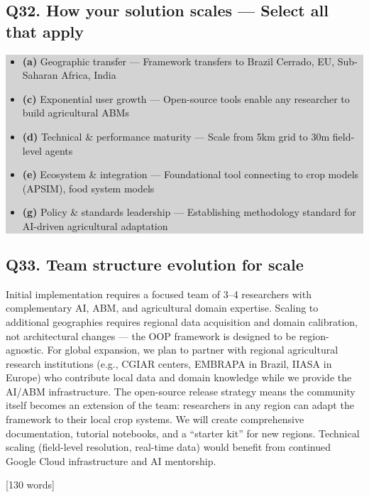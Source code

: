 \documentclass[11pt,letterpaper]{article}
\newcommand{\answer}[1]{%
    \vspace{0.2em}%
    \noindent\colorbox{answerbox}{\parbox{\dimexpr\textwidth-2\fboxsep}{%
        \vspace{0.4em}#1\vspace{0.4em}%
    }}%
    \vspace{0.5em}%
}
\newcommand{\selection}[1]{%
    \vspace{0.2em}%
    \noindent\colorbox{lightgray}{\parbox{\dimexpr\textwidth-2\fboxsep}{%
        \vspace{0.3em}#1\vspace{0.3em}%
    }}%
    \vspace{0.5em}%
}
\newcommand{\wordcount}[1]{%
    \hfill{\scriptsize\textcolor{notegray}{[#1 words]}}%
}
\begin{document}
\subsection{Q32. How your solution scales --- Select all that apply}
\selection{
\begin{itemize}[nosep,leftmargin=1.5em]
    \item[$\boxtimes$] \textbf{(a)} Geographic transfer --- Framework transfers to Brazil Cerrado, EU, Sub-Saharan Africa, India
    \item[$\boxtimes$] \textbf{(c)} Exponential user growth --- Open-source tools enable any researcher to build agricultural ABMs
    \item[$\boxtimes$] \textbf{(d)} Technical \& performance maturity --- Scale from 5km grid to 30m field-level agents
    \item[$\boxtimes$] \textbf{(e)} Ecosystem \& integration --- Foundational tool connecting to crop models (APSIM), food system models
    \item[$\boxtimes$] \textbf{(g)} Policy \& standards leadership --- Establishing methodology standard for AI-driven agricultural adaptation
\end{itemize}
}

\subsection{Q33. Team structure evolution for scale}
\answer{Initial implementation requires a focused team of 3--4 researchers with complementary AI, ABM, and agricultural domain expertise. Scaling to additional geographies requires regional data acquisition and domain calibration, not architectural changes --- the OOP framework is designed to be region-agnostic. For global expansion, we plan to partner with regional agricultural research institutions (e.g., CGIAR centers, EMBRAPA in Brazil, IIASA in Europe) who contribute local data and domain knowledge while we provide the AI/ABM infrastructure. The open-source release strategy means the community itself becomes an extension of the team: researchers in any region can adapt the framework to their local crop systems. We will create comprehensive documentation, tutorial notebooks, and a ``starter kit'' for new regions. Technical scaling (field-level resolution, real-time data) would benefit from continued Google Cloud infrastructure and AI mentorship.}
\wordcount{130}

\end{document}
